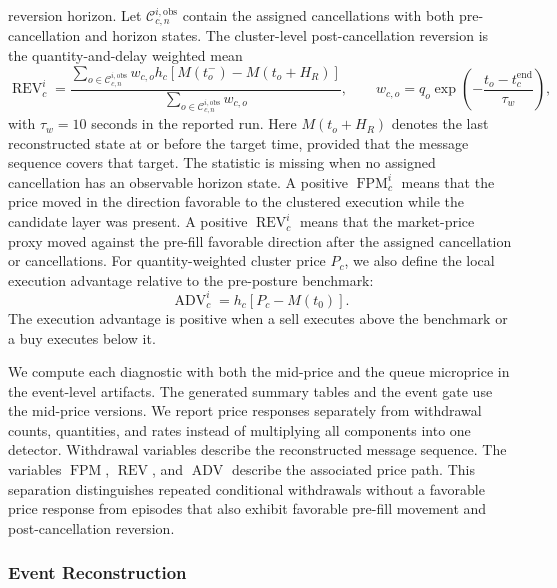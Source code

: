 \documentclass[11pt]{article}
\begin{document}
reversion horizon. Let $\mathcal{C}_{c,n}^{i,\mathrm{obs}}$ contain the assigned cancellations with both pre-cancellation
and horizon states. The cluster-level post-cancellation reversion is the quantity-and-delay weighted mean
\begin{equation}
    \operatorname{REV}^{i}_{c}
    =
    \frac{
        \sum_{o\in\mathcal{C}_{c,n}^{i,\mathrm{obs}}}
        w_{c,o}h_c\left[M(t_o^{-})-M(t_o+H_R)\right]
    }{
        \sum_{o\in\mathcal{C}_{c,n}^{i,\mathrm{obs}}} w_{c,o}
    },
    \qquad
    w_{c,o}=q_o\exp\!\left(-\frac{t_o-t_c^{\mathrm{end}}}{\tau_w}\right),
    \label{eq:price_reversion}
\end{equation}
with $\tau_w=10$ seconds in the reported run. Here $M(t_o+H_R)$ denotes the last reconstructed state at or before the
target time, provided that the message sequence covers that target. The statistic is missing when no assigned cancellation
has an observable horizon state.
A positive $\operatorname{FPM}^{i}_{c}$ means that the price moved in the direction favorable to the clustered execution
while the candidate layer was present. A positive $\operatorname{REV}^{i}_{c}$ means that the market-price proxy moved
against the pre-fill favorable direction after the assigned cancellation or cancellations. For quantity-weighted cluster
price $P_c$, we also define the local execution advantage relative to the pre-posture benchmark:
\begin{equation}
    \operatorname{ADV}^{i}_{c}
    =
    h_c\left[P_c-M(t_0)\right].
    \label{eq:execution_advantage}
\end{equation}
The execution advantage is positive when a sell executes above the benchmark or a buy executes below it.

We compute each diagnostic with both the mid-price and the queue microprice in the event-level artifacts. The generated
summary tables and the event gate use the mid-price versions. We report price responses separately from withdrawal counts,
quantities, and rates instead of multiplying all components into one detector. Withdrawal variables describe the
reconstructed message sequence. The variables $\operatorname{FPM}$, $\operatorname{REV}$, and $\operatorname{ADV}$
describe the associated price path. This separation distinguishes repeated conditional withdrawals without a favorable
price response from episodes that also exhibit favorable pre-fill movement and post-cancellation reversion.

\subsubsection{Event Reconstruction}
\label{subsec:event_reconstruction}
\end{document}
